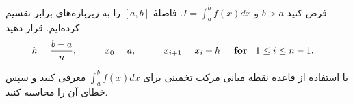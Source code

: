 فرض کنید 
\(b>a\)
و
\(I =\int_{a}^{b} f(x) dx\).
 فاصلهٔ 
\([a,b]\)
را به زیربازه‌های برابر تقسیم کرده‌ایم. قرار دهید
\begin{align*}
	& h= \frac{b-a}{n}, \hspace*{1cm} x_0=a, \hspace*{1cm} x_{i+1} = x_i + h \hspace*{.5cm} \textbf{for} \hspace*{.3cm} 1 \leq i \leq n-1.
\end{align*}
\iffalse
بنابراین زیربازه‌هایی به‌طول برابر با
\(h\)
به صورت 
\([x_i, x_{i+1}]\)
به ازای
\(i=0, \ldots, n-1\)
داریم. 
\fi
با استفاده از قاعده نقطه میانی مرکب  تخمینی برای 
\(\int_{a}^{b} f(x) dx\)
معرفی کنید و سپس خطای آن را محاسبه کنید.

